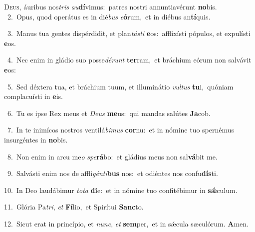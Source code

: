 \lettrine{\initial\textcolor{\initialcolor}{D}}{eus,} áuribus nos\textit{tris} \textit{au}\-\textbf{dí}vimus:~\star patres nostri annuntiavérunt \textbf{no}\-bis.\\
{\numbfont\textcolor{\numbcolor}{~2.}}~Opus, quod operátus es in dié\textit{bus} \textit{e}\-\textbf{ó}rum,~\star et in diébus an\-\textbf{tí}\-quis.\par
{\numbfont\textcolor{\numbcolor}{~3.}}~Manus tua gentes dispérdidit, et plan\-\textit{tás}\-\textit{ti} \textbf{e}\-os:~\star afflixísti pópulos, et expulísti \textbf{e}\-os.\par
{\numbfont\textcolor{\numbcolor}{~4.}}~Nec enim in gládio suo posse\-\textit{dé}\-\textit{runt} \textbf{ter}\-ram,~\star et bráchium eórum non salvávit \textbf{e}\-os:\par
{\numbfont\textcolor{\numbcolor}{~5.}}~Sed déxtera tua, et bráchium tuum, et illuminátio \textit{vul}\-\textit{tus} \textbf{tu}\-i,~\star quóniam complacuísti in \textbf{e}\-is.\par
{\numbfont\textcolor{\numbcolor}{~6.}}~Tu es ipse Rex meus et \textit{De}\-\textit{us} \textbf{me}\-us:~\star qui mandas salútes \textbf{Ja}\-cob.\par
{\numbfont\textcolor{\numbcolor}{~7.}}~In te inimícos nostros ventilá\-\textit{bi}\-\textit{mus} \textbf{cor}\-nu:~\star et in nómine tuo spernémus insurgéntes in \textbf{no}\-bis.\par
{\numbfont\textcolor{\numbcolor}{~8.}}~Non enim in arcu me\textit{o} \textit{spe}\-\textbf{rá}bo:~\star et gládius meus non sal\-\textbf{vá}\-bit me.\par
{\numbfont\textcolor{\numbcolor}{~9.}}~Salvásti enim nos de affli\-\textit{gén}\-\textit{ti}\textbf{bus} nos:~\star et odiéntes nos confu\-\textbf{dís}\-ti.\par
{\numbfont\textcolor{\numbcolor}{10.}}~In Deo laudábimur \textit{to}\-\textit{ta} \textbf{di}\-e:~\star et in nómine tuo confitébimur in \textbf{sǽ}\-culum.\par
{\numbfont\textcolor{\numbcolor}{11.}}~Glória Pa\-\textit{tri}\-, \textit{et} \textbf{Fí}\-lio,~\star et Spirítui \textbf{Sanc}\-to.\par
{\numbfont\textcolor{\numbcolor}{12.}}~Sicut erat in princípio, et \textit{nunc}\-, \textit{et} \textbf{sem}\-per,~\star et in sǽcula sæculórum. \textbf{A}\-men.\par
